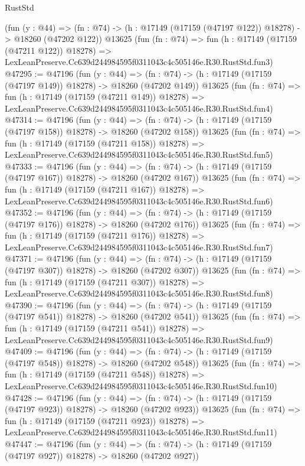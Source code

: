\begin{lexlean}{RustStd}
\begin{coremodule}
    (fun (y : @44) =>
    (fn : @74) -> (h : @17149 (@17159 (@47197 @122)) @18278) -> @18260 (@47202 @122))
    @13625
    (fun (fn : @74) =>
    fun (h : @17149 (@17159 (@47211 @122)) @18278) =>
    LexLeanPreserve.Cc639d244984595f0311043c4c505146e.R30.RustStd.fun3)
@47295 := @47196
    (fun (y : @44) =>
    (fn : @74) -> (h : @17149 (@17159 (@47197 @149)) @18278) -> @18260 (@47202 @149))
    @13625
    (fun (fn : @74) =>
    fun (h : @17149 (@17159 (@47211 @149)) @18278) =>
    LexLeanPreserve.Cc639d244984595f0311043c4c505146e.R30.RustStd.fun4)
@47314 := @47196
    (fun (y : @44) =>
    (fn : @74) -> (h : @17149 (@17159 (@47197 @158)) @18278) -> @18260 (@47202 @158))
    @13625
    (fun (fn : @74) =>
    fun (h : @17149 (@17159 (@47211 @158)) @18278) =>
    LexLeanPreserve.Cc639d244984595f0311043c4c505146e.R30.RustStd.fun5)
@47333 := @47196
    (fun (y : @44) =>
    (fn : @74) -> (h : @17149 (@17159 (@47197 @167)) @18278) -> @18260 (@47202 @167))
    @13625
    (fun (fn : @74) =>
    fun (h : @17149 (@17159 (@47211 @167)) @18278) =>
    LexLeanPreserve.Cc639d244984595f0311043c4c505146e.R30.RustStd.fun6)
@47352 := @47196
    (fun (y : @44) =>
    (fn : @74) -> (h : @17149 (@17159 (@47197 @176)) @18278) -> @18260 (@47202 @176))
    @13625
    (fun (fn : @74) =>
    fun (h : @17149 (@17159 (@47211 @176)) @18278) =>
    LexLeanPreserve.Cc639d244984595f0311043c4c505146e.R30.RustStd.fun7)
@47371 := @47196
    (fun (y : @44) =>
    (fn : @74) -> (h : @17149 (@17159 (@47197 @307)) @18278) -> @18260 (@47202 @307))
    @13625
    (fun (fn : @74) =>
    fun (h : @17149 (@17159 (@47211 @307)) @18278) =>
    LexLeanPreserve.Cc639d244984595f0311043c4c505146e.R30.RustStd.fun8)
@47390 := @47196
    (fun (y : @44) =>
    (fn : @74) -> (h : @17149 (@17159 (@47197 @541)) @18278) -> @18260 (@47202 @541))
    @13625
    (fun (fn : @74) =>
    fun (h : @17149 (@17159 (@47211 @541)) @18278) =>
    LexLeanPreserve.Cc639d244984595f0311043c4c505146e.R30.RustStd.fun9)
@47409 := @47196
    (fun (y : @44) =>
    (fn : @74) -> (h : @17149 (@17159 (@47197 @548)) @18278) -> @18260 (@47202 @548))
    @13625
    (fun (fn : @74) =>
    fun (h : @17149 (@17159 (@47211 @548)) @18278) =>
    LexLeanPreserve.Cc639d244984595f0311043c4c505146e.R30.RustStd.fun10)
@47428 := @47196
    (fun (y : @44) =>
    (fn : @74) -> (h : @17149 (@17159 (@47197 @923)) @18278) -> @18260 (@47202 @923))
    @13625
    (fun (fn : @74) =>
    fun (h : @17149 (@17159 (@47211 @923)) @18278) =>
    LexLeanPreserve.Cc639d244984595f0311043c4c505146e.R30.RustStd.fun11)
@47447 := @47196
    (fun (y : @44) =>
    (fn : @74) -> (h : @17149 (@17159 (@47197 @927)) @18278) -> @18260 (@47202 @927))

\end{coremodule}
\end{lexlean}
